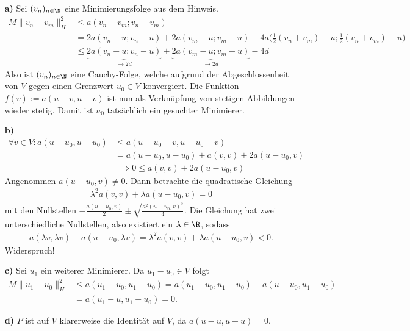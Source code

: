 \begin{solution}

\begin{itemize}
  \item[\textbf{a)}]
    Sei $(v_n)_{n\in\N}$ eine Minimierungsfolge aus dem Hinweis.
    \begin{align*}
    M\|v_n - v_m\|_H^2 &\leq
    a(v_n - v_m ; v_n - v_m ) \\
    &=
    2a(v_n - u; v_n - u) + 2a(v_m - u; v_m - u) -
    4a\Bigg(\frac{1}{2}(v_n + v_m ) - u;\frac{1}{2}(v_n + v_m )- u\Bigg) \\
    &\leq \underbrace{2a(v_n - u; v_n - u)}_{\to 2d} + \underbrace{2a(v_m - u; v_m - u)}_{\to 2d} - 4d
    \end{align*}
    Also ist $(v_n)_{n \in \N}$ eine Cauchy-Folge, welche aufgrund der Abgeschlossenheit
    von $V$ gegen einen Grenzwert $u_0 \in V$ konvergiert.
    Die Funktion $f(v) := a(u-v,u-v)$ ist nun als Verknüpfung von stetigen Abbildungen wieder stetig.
    Damit ist $u_0$ tatsächlich ein gesuchter Minimierer.
  \item[\textbf{b)}]
  \begin{align*}
    \forall v \in V: a(u - u_0, u - u_0) &\leq a(u - u_0 + v, u - u_0 + v) \\
    &= a(u - u_0, u - u_0) + a(v,v) + 2a(u - u_0, v) \\
    &\implies 0 \leq a(v,v) + 2a(u - u_0, v)
  \end{align*}
  Angenommen $a(u - u_0, v) \neq 0$. Dann betrachte die quadratische Gleichung
  \begin{align*}
    \lambda^2 a(v,v) + \lambda a(u-u_0,v) = 0
  \end{align*}
  mit den Nullstellen $-\frac{a(u-u_0,v)}{2} \pm \sqrt{\frac{a^2(u-u_0,v)^2}{4}}$.
  Die Gleichung hat zwei unterschiedliche Nullstellen, also existiert ein $\lambda \in \R$, sodass
  \begin{align*}
    a(\lambda v, \lambda v) + a(u-u_0,\lambda v) = \lambda^2 a(v,v) + \lambda a(u-u_0,v) < 0.
  \end{align*}
  Widerspruch!
  \item[\textbf{c)}]
    Sei $u_1$ ein weiterer Minimierer. Da $u_1 - u_0 \in V$ folgt
    \begin{align*}
      M\|u_1-u_0\|_H^2 &\leq a(u_1 - u_0, u_1 - u_0) = a(u_1 - u_0, u_1 - u_0) - a(u - u_0, u_1 - u_0) \\
      &= a(u_1 -u, u_1 - u_0) = 0.
    \end{align*}
  \item[\textbf{d)}] $P$ ist auf $V$ klarerweise die Identität auf $V$, da $a(u-u,u-u) = 0$.

\end{itemize}
\end{solution}
